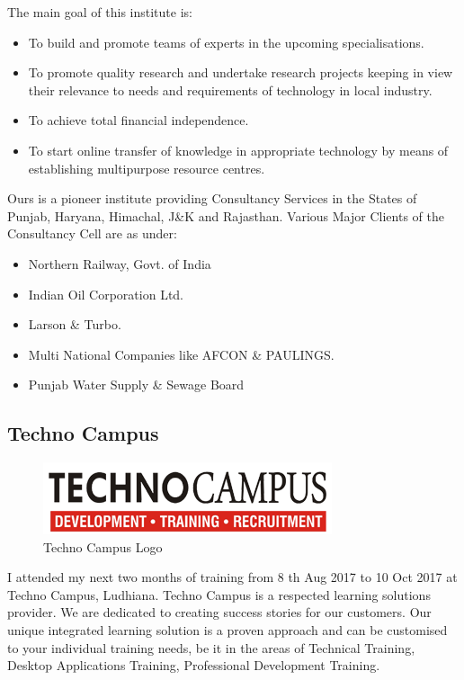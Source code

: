 The main goal of this institute is:
\begin{itemize}
\item To build and promote teams of experts in the upcoming specialisations.
\item To promote quality research and undertake research projects keeping in view their
relevance to needs and requirements of technology in local industry.
\item To achieve total financial independence.
\item To start online transfer of knowledge in appropriate technology by means of establishing multipurpose resource centres.
\end{itemize}

Ours is a pioneer institute providing Consultancy Services in the States of Punjab, Haryana,
Himachal, J\&K and Rajasthan. Various Major Clients of the Consultancy Cell are as under:\\
\begin{itemize}
\item Northern Railway, Govt. of India
\item Indian Oil Corporation Ltd.
\item Larson \& Turbo.
\item Multi National Companies like AFCON \& PAULINGS.
\item Punjab Water Supply \& Sewage Board
\end{itemize}
\subsection{Techno Campus}
\begin{figure}[ht]
\centering
\includegraphics[scale=0.5]{input/images/techno.png}
\caption{Techno Campus Logo}
\end{figure}
I attended my next two months of training from 8 th Aug 2017 to 10 Oct 2017 at Techno Campus, Ludhiana.
Techno Campus is a respected learning solutions provider. We are dedicated to creating success stories for
our customers. Our unique integrated learning solution is a proven approach and can be customised to your
individual training needs, be it in the areas of Technical Training, Desktop Applications Training,
Professional Development Training.
